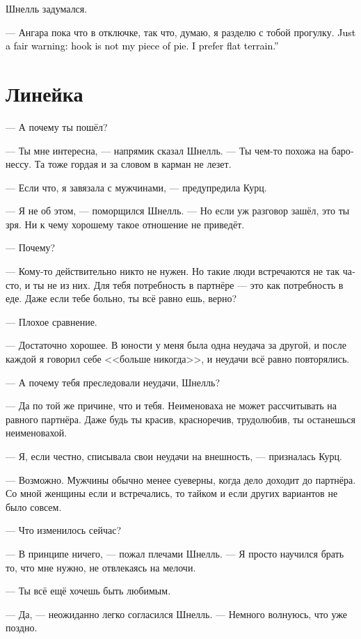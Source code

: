 \documentclass[a4paper,12pt,fleqn]{book}\usepackage{cooltooltips}\usepackage{polyglossia}\setdefaultlanguage[babelshorthands=true]{russian}\setotherlanguage{english}\defaultfontfeatures{Ligatures=TeX,Mapping=tex-text} \usepackage{xcolor}\definecolor{lightgray}{HTML}{bbbbbb}\color{lightgray}\newcommand{\ml}[3]{\textenglish{\textcolor{black}{#3}}}
\begin{document}
Шнелль задумался.

--- Ангара пока что в отключке, так что, думаю, я разделю с тобой прогулку.
\ml{$0$}
{Только хочу предупредить: хук --- это не моё.}
{Just a fair warning: hook is not my piece of pie.}
\ml{$0$}
{Предпочитаю равнинную местность.}
{I prefer flat terrain.''}

\section{Линейка}

--- А почему ты пошёл?

--- Ты мне интересна, --- напрямик сказал Шнелль.
--- Ты чем-то похожа на баронессу.
Та тоже гордая и за словом в карман не лезет.

--- Если что, я завязала с мужчинами, --- предупредила Курц.

--- Я не об этом, --- поморщился Шнелль.
--- Но если уж разговор зашёл, это ты зря.
Ни к чему хорошему такое отношение не приведёт.

--- Почему?

--- Кому-то действительно никто не нужен.
Но такие люди встречаются не так часто, и ты не из них.
Для тебя потребность в партнёре --- это как потребность в еде.
Даже если тебе больно, ты всё равно ешь, верно?

--- Плохое сравнение.

--- Достаточно хорошее.
В юности у меня была одна неудача за другой, и после каждой я говорил себе <<больше никогда>>, и неудачи всё равно повторялись.

--- А почему тебя преследовали неудачи, Шнелль?

--- Да по той же причине, что и тебя.
Неименоваха не может рассчитывать на равного партнёра.
Даже будь ты красив, красноречив, трудолюбив, ты останешься неименовахой.

--- Я, если честно, списывала свои неудачи на внешность, --- призналась Курц.

--- Возможно.
Мужчины обычно менее суеверны, когда дело доходит до партнёра.
Со мной женщины если и встречались, то тайком и если других вариантов не было совсем.

--- Что изменилось сейчас?

--- В принципе ничего, --- пожал плечами Шнелль.
--- Я просто научился брать то, что мне нужно, не отвлекаясь на мелочи.

--- Ты всё ещё хочешь быть любимым.

--- Да, --- неожиданно легко согласился Шнелль.
--- Немного волнуюсь, что уже поздно.
\end{document}
